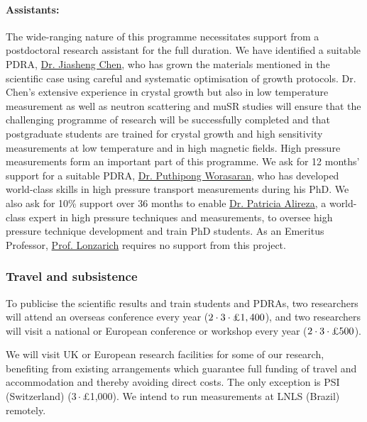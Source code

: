 \documentclass[prl,a4paper,11pt]{revtex4-2}
\begin{document}
\begin{singlespace}
\paragraph{Assistants:}
The wide-ranging nature of this programme necessitates support from a
postdoctoral research assistant for the full duration. We have identified a suitable PDRA, \ul{Dr. Jiasheng Chen}, who has grown the materials mentioned in the scientific case using careful and systematic optimisation of growth protocols. Dr. Chen's extensive experience in crystal growth but also in low temperature measurement as well as neutron scattering and muSR studies will ensure that the challenging programme of research will be successfully completed and that postgraduate students are trained for crystal growth and high sensitivity measurements at low temperature and in high magnetic fields. High pressure measurements form an important part of this programme. We ask for 12 months' support for a suitable PDRA, \ul{Dr. Puthipong Worasaran}, who has developed world-class skills in high pressure transport measurements during his PhD. We also ask for 10\% support over 36 months to enable \ul{Dr. Patricia Alireza,} a world-class expert in high pressure techniques and measurements, to oversee high pressure technique development and train PhD students. As an Emeritus Professor, \ul{Prof. Lonzarich} requires no support from this project.

\subsubsection{Travel and subsistence}
\noindent
To publicise the scientific results and train students and PDRAs, two researchers will attend an overseas conference
every year ($2\cdot 3\cdot \text{\pounds} 1,400$), and two researchers
will visit a national or European conference or workshop every year  ($2\cdot
3\cdot \text{\pounds}
500$).

We will visit UK or European research facilities for some of our research, benefiting from existing arrangements which guarantee full funding of travel and accommodation and thereby avoiding direct costs.
The only exception is PSI (Switzerland) ($3\cdot$\pounds 1,000). We intend to run measurements at LNLS (Brazil) remotely.


\end{singlespace}
\end{document}
